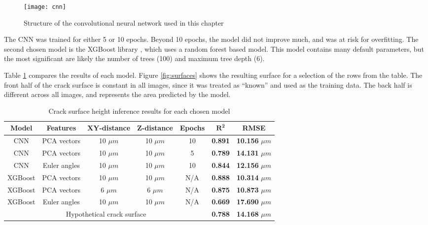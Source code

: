 \begin{figure}[b]
  \centering
    \texttt{[image: cnn]}
    \caption{Structure of the convolutional neural network used in this chapter}
  \label{fig:cnn}
\end{figure}

The CNN was trained for either 5 or 10 epochs.  Beyond 10 epochs, the model did not improve much, and was at risk for overfitting.  The second chosen model is the XGBoost library \cite{xgboost}, which uses a random forest based model.  This model contains many default parameters, but the most significant are likely the number of trees (100) and maximum tree depth (6).

Table \ref{table:model-comparison} compares the results of each model.  Figure \ref{fig:surfaces} shows the resulting surface for a selection of the rows from the table.  The front half of the crack surface is constant in all images, since it was treated as ``known'' and used as the training data.  The back half is different across all images, and represents the area predicted by the model.

\begin{table}[b]
  \centering
  \caption{Crack surface height inference results for each chosen model}
  \label{table:model-comparison}
  \begin{tabular}{| c | c | c | c | c | c | c |} \hline
    \textbf{Model} & \textbf{Features} & \textbf{XY-distance} & \textbf{Z-distance} & \textbf{Epochs} & $\bm{R^2}$     & \textbf{RMSE}           \\ \hline
    CNN            & PCA vectors       & 10 $\mu m$           & 10 $\mu m$          & 10              & \textbf{0.891} & \textbf{10.156} $\mu m$ \\ \hline
    CNN            & PCA vectors       & 10 $\mu m$           & 10 $\mu m$          & 5               & \textbf{0.789} & \textbf{14.131} $\mu m$ \\ \hline
    CNN            & Euler angles      & 10 $\mu m$           & 10 $\mu m$          & 10              & \textbf{0.844} & \textbf{12.156} $\mu m$ \\ \hline
    XGBoost        & PCA vectors       & 10 $\mu m$           & 10 $\mu m$          & N/A             & \textbf{0.888} & \textbf{10.314} $\mu m$ \\ \hline
    XGBoost        & PCA vectors       & 6  $\mu m$           & 6  $\mu m$          & N/A             & \textbf{0.875} & \textbf{10.873} $\mu m$ \\ \hline
    XGBoost        & Euler angles      & 10 $\mu m$           & 10 $\mu m$          & N/A             & \textbf{0.669} & \textbf{17.690} $\mu m$ \\ \hline
    \multicolumn{5}{|c|}{Hypothetical crack surface}                                                  & \textbf{0.788} & \textbf{14.168} $\mu m$ \\ \hline
  \end{tabular}
\end{table}


